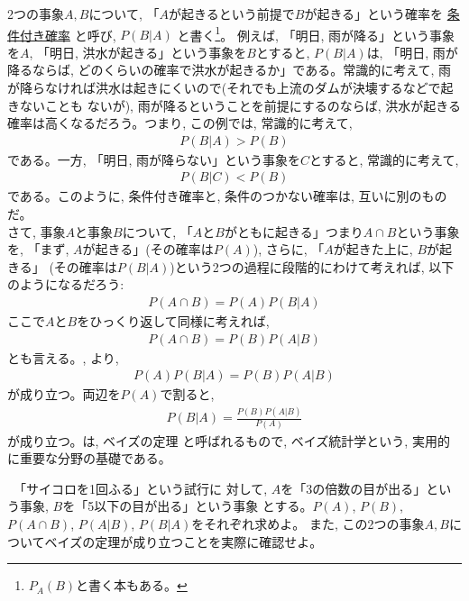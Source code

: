 2つの事象$A, B$について, 「$A$が起きるという前提で$B$が起きる」という確率を
\underline{条件付き確率} と呼び, $P(B|A)$
と書く\footnote{$P_A(B)$と書く本もある。}。
例えば, 「明日, 雨が降る」という事象を$A$, 「明日, 洪水が起きる」という事象を$B$とすると, 
$P(B|A)$は, 「明日, 雨が降るならば, どのくらいの確率で洪水が起きるか」である。常識的に考えて, 
雨が降らなければ洪水は起きにくいので(それでも上流のダムが決壊するなどで起きないことも
ないが), 雨が降るということを前提にするのならば, 洪水が起きる確率は高くなるだろう。つまり, 
この例では, 常識的に考えて, 
\begin{eqnarray}P(B|A)>P(B)\end{eqnarray}
である。一方, 「明日, 雨が降らない」という事象を$C$とすると, 常識的に考えて, 
\begin{eqnarray}P(B|C)<P(B)\end{eqnarray}
である。このように, 条件付き確率と, 条件のつかない確率は, 互いに別のものだ。\\

さて, 事象$A$と事象$B$について, 「$A$と$B$がともに起きる」つまり$A\cap B$という事象を, 
「まず, $A$が起きる」(その確率は$P(A)$), さらに, 「$A$が起きた上に, $B$が起きる」
(その確率は$P(B|A)$)という2つの過程に段階的にわけて考えれば, 以下のようになるだろう:
\begin{eqnarray}
P(A\cap B)=P(A)P(B|A)\label{eq:condprob1}
\end{eqnarray}
ここで$A$と$B$をひっくり返して同様に考えれば, 
\begin{eqnarray}
P(A\cap B)=P(B)P(A|B)\label{eq:condprob2}
\end{eqnarray}
とも言える。, より, 
\begin{eqnarray}
P(A)P(B|A)=P(B)P(A|B)\label{eq:condprob3}
\end{eqnarray}
が成り立つ。両辺を$P(A)$で割ると, 
\begin{eqnarray}
P(B|A)=\frac{P(B)P(A|B)}{P(A)}\label{eq:condprob4}
\end{eqnarray}
が成り立つ。は, ベイズの定理
と呼ばれるもので, ベイズ統計学という, 実用的に重要な分野の基礎である。\\

\begin{q}\label{q:stat_cond_probability}　「サイコロを1回ふる」という試行に
対して, $A$を「3の倍数の目が出る」という事象, $B$を「5以下の目が出る」という事象
とする。$P(A)$, $P(B)$, $P(A\cap B)$, $P(A|B)$, $P(B|A)$をそれぞれ求めよ。
また, この2つの事象$A, B$についてベイズの定理が成り立つことを実際に確認せよ。\end{q}
\vv


